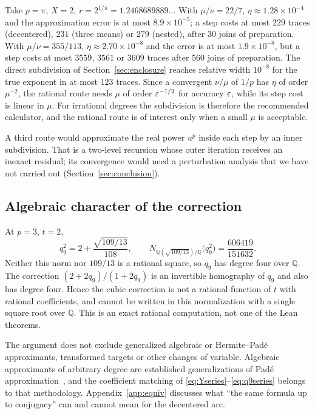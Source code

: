 \begin{remark}\label{rem:pi}
Take $p=\pi$, $X=2$, $r=2^{1/\pi}=1.2468689889\ldots$ With $\mu/\nu=22/7$, $\eta\approx1.28\times10^{-4}$
and the approximation error is at most $8.9\times10^{-5}$; a step costs at most $229$ traces (decentered),
$231$ (three means) or $279$ (nested), after $30$ joins of preparation. With $\mu/\nu=355/113$, $\eta\approx2.70\times10^{-8}$
and the error is at most $1.9\times10^{-8}$, but a step costs at most $3559$, $3561$ or $3609$ traces after $560$
joins of preparation. The direct subdivision of Section~\ref{sec:enclosure} reaches relative width
$10^{-8}$ for the true exponent in at most $123$ traces. Since a convergent $\nu/\mu$ of $1/p$ has
$\eta$ of order $\mu^{-2}$, the rational route needs $\mu$ of order $\varepsilon^{-1/2}$ for accuracy $\varepsilon$,
while its step cost is linear in $\mu$. For irrational degrees the subdivision is therefore the
recommended calculator, and the rational route is of interest only when a small $\mu$ is acceptable.
\end{remark}

A third route would approximate the real power $u^{p}$ inside each step by an inner subdivision. That
is a two-level recursion whose outer iteration receives an inexact residual; its convergence would need
a perturbation analysis that we have not carried out (Section~\ref{sec:conclusion}).

\subsection{Algebraic character of the correction}\label{sec:algebraic}

At $p=3$, $t=2$,
\[ q_9^{2}=2+\frac{\sqrt{109/13}}{108},\qquad
N_{\mathbb{Q}(\sqrt{109/13})/\mathbb{Q}}\bigl(q_9^{2}\bigr)=\frac{606419}{151632}. \]
Neither this norm nor $109/13$ is a rational square, so $q_9$ has degree four over $\mathbb{Q}$. The
correction $(2+2q_9)/(1+2q_9)$ is an invertible homography of $q_9$ and also has degree four. Hence
the cubic correction is not a rational function of $t$ with rational coefficients, and cannot be written
in this normalization with a single square root over $\mathbb{Q}$. This is an exact rational computation,
not one of the Lean theorems.

The argument does not exclude generalized algebraic or Hermite--Pad\'e approximants, transformed targets
or other changes of variable. Algebraic approximants of arbitrary degree are established generalizations
of Pad\'e approximation~\cite{sergeev}, and the coefficient matching of \eqref{eq:Yseries}--\eqref{eq:q9series}
belongs to that methodology. Appendix~\ref{app:equiv} discusses what ``the same formula up to
conjugacy'' can and cannot mean for the decentered arc.
